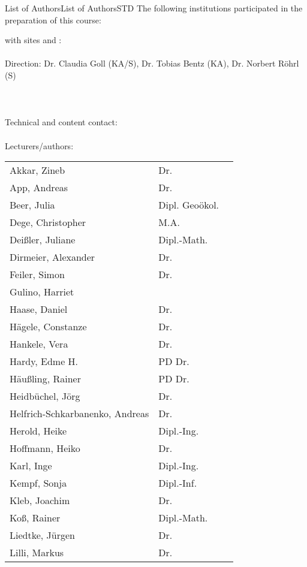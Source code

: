 \begin{MXContent}{List of Authors}{List of Authors}{STD}
The following institutions participated in the preparation of this course:

 with sites  and :\\
\ \\
Direction: Dr. Claudia Goll (KA/S), Dr. Tobias Bentz (KA), Dr. Norbert Röhrl (S)\\ \ \\
\ \\ \ \\
Technical and content contact: 
\ \\ \ \\
Lecturers/authors:\\
\begin{tabular}{lll}
Akkar, Zineb&Dr.& \\
App, Andreas&Dr.& \\
Beer, Julia&Dipl. Geoökol.& \\
Dege, Christopher&M.A.& \\
Deißler, Juliane&Dipl.-Math.& \\
Dirmeier, Alexander&Dr.& \\
Feiler, Simon&Dr.& \\
Gulino, Harriet& \\
Haase, Daniel&Dr.& \\
Hägele, Constanze&Dr.& \\
Hankele, Vera&Dr.&\\
Hardy, Edme H.&PD Dr.& \\
Häußling, Rainer&PD Dr.& \\
Heidbüchel, Jörg&Dr.&\\
Helfrich-Schkarbanenko, Andreas&Dr.& \\
Herold, Heike&Dipl.-Ing.&\\
Hoffmann, Heiko&Dr.&\\
Karl, Inge&Dipl.-Ing.& \\
Kempf, Sonja&Dipl.-Inf.& \\
Kleb, Joachim&Dr.& \\
Koß, Rainer&Dipl.-Math.& \\
Liedtke, Jürgen&Dr.&\\
Lilli, Markus&Dr.& \\

\end{tabular}
\end{MXContent}
